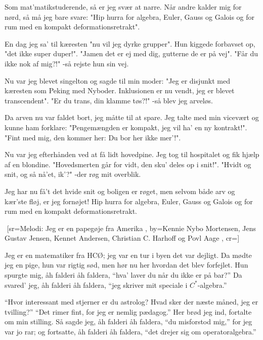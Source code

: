 \documentclass[pdftex,12pt]{article}
\begin{document}
\begin{songs}{}
\beginverse
Som mat'matikstuderende, så er jeg svær at narre.
Når andre kalder mig for nørd, så må jeg bare svare:
"Hip hurra for algebra,
Euler, Gauss og Galois
og for rum med en kompakt deformationsretrakt".

\endverse
\beginverse
En dag jeg sa' til kæresten "nu vil jeg dyrke grupper".
Hun kiggede forbavset op, "det ikke super duper!".
"Jamen det er ej med dig,
gutterne de er på vej".
"Får du ikke nok af mig?!" -så rejste hun sin vej.

\endverse
\beginverse
Nu var jeg blevet singelton og sagde til min moder:
"Jeg er disjunkt med kæresten som Peking med Nyboder.
Inklusionen er nu vendt,
jeg er blevet transcendent".
"Er du trans, din klamme tøs?!" -så blev jeg arveløs.

\endverse
\beginverse
Da arven nu var faldet bort, jeg måtte til at spare.
Jeg talte med min vicevært og kunne ham forklare:
"Pengemængden er kompakt,
jeg vil ha' en ny kontrakt!".
"Fint med mig, den kommer her: Du bor her ikke mer'!".

\endverse
\beginverse
Nu var jeg efterhånden ved at få lidt hovedpine.
Jeg tog til hospitalet og fik hjælp af en blondine.
"Hovedsmerten går for vidt,
den sku' deles op i snit!".
"Hvidt og snit, og så nå'et, ik'?" -der røg mit overblik.

\endverse
\beginverse
Jeg har nu få't det hvide snit og boligen er røget,
men selvom både arv og kær'ste fløj, er jeg fornøjet!
Hip hurra for algebra,
Euler, Gauss og Galois
og for rum med en kompakt deformationsretrakt.

\endverse
\endsong



﻿%
[sr={Melodi: Jeg er en papegøje fra Amerika}
,
by={Kennie Nybo Mortensen, Jens Gustav Jensen, Kennet Andersen, Christian C. Harhoff og Povl Aage}
,
cr={}]\hypertarget{Jeg er en matematiker fra HCØ}{}
\label{song2}

\beginverse
Jeg er en matematiker fra HCØ;
jeg var en tur i byen det var dejligt.
Da mødte jeg en pige, hun var rigtig sød,
men hør nu her hvordan det blev forfejlet.
Hun spurgte mig, åh falderi åh faldera,
``hva' laver du når du ikke er på bar?''
Da svared' jeg, åh falderi åh faldera,
``jeg skriver mit speciale i $C^*$-algebra.''

\endverse
\beginverse
``Hvor interessant med stjerner er du astrolog?
Hvad sker der næste måned, jeg er tvilling?''
``Det rimer fint, for jeg er nemlig pædagog.''
Her brød jeg ind, fortalte om min stilling.
Så sagde jeg, åh falderi åh faldera,
``du misforstod mig,'' for jeg var jo rar;
og fortsatte, åh falderi åh faldera,
``det drejer sig om operatoralgebra.''


\end{songs}
\end{document}
